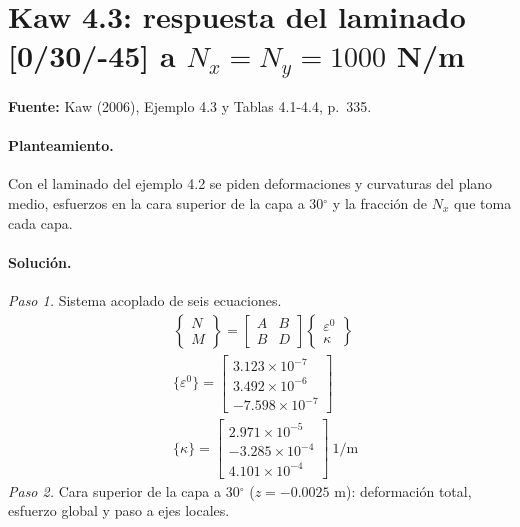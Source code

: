 \documentclass[11pt]{article}
\begin{document}
\clearpage
\section{Kaw 4.3: respuesta del laminado [0/30/-45] a $N_x=N_y=1000$ N/m}\label{ej:kaw_4_3}
\textbf{Fuente:} Kaw (2006), Ejemplo 4.3 y Tablas 4.1-4.4, p.~335.

\paragraph{Planteamiento.} Con el laminado del ejemplo 4.2 se piden deformaciones y curvaturas del plano medio, esfuerzos en la cara superior de la capa a 30\ensuremath{^\circ} y la fracción de $N_x$ que toma cada capa.

\paragraph{Solución.}
\textit{Paso 1.} Sistema acoplado de seis ecuaciones.
\begin{align*}
&\begin{Bmatrix}N\\M\end{Bmatrix}=\begin{bmatrix}A&B\\B&D\end{bmatrix}\begin{Bmatrix}\varepsilon^0\\\kappa\end{Bmatrix} \\
&\{\varepsilon^0\}=\begin{bmatrix}3.123\times10^{-7} \\ 3.492\times10^{-6} \\ -7.598\times10^{-7}\end{bmatrix} \\
&\{\kappa\}=\begin{bmatrix}2.971\times10^{-5} \\ -3.285\times10^{-4} \\ 4.101\times10^{-4}\end{bmatrix}\ \mathrm{1/m}
\end{align*}
\textit{Paso 2.} Cara superior de la capa a 30\ensuremath{^\circ} ($z=-0.0025$ m): deformación total, esfuerzo global y paso a ejes locales.
\end{document}
